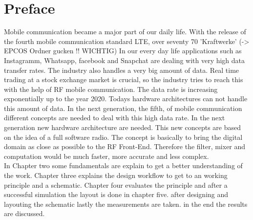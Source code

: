 \chapter{Preface}
Mobile communication became a major part of our daily life. With the release of the fourth mobile communication standard LTE, over seventy 70 'Kraftwerke' (-> EPCOS Ordner gucken !! WICHTIG)
In our every day life applications such as Instagramm, Whatsapp, facebook and Snapchat  are dealing with very high data transfer rates. The industry also handles a very big amount of data. Real time trading at a stock exchange market is crucial, so the industry tries to reach this with the help of RF mobile communication. The data rate is increasing exponentially up to the year 2020. Todays hardware architectures can not handle this amount of data. In the next generation, the fifth, of mobile communication different concepts are needed to deal with this high data rate. In the next generation new hardware architecture are needed. This new concepts are based on the idea of a full software radio. The concept is basically to bring the digital domain as close as possible to the RF Front-End. Therefore the filter, mixer and computation would be much faster, more accurate and less complex. \\
In Chapter two some fundamentals are explain to get a better understanding of the work. Chapter three explains the design workflow to get to an working principle and a schematic. Chapter four evaluates the principle and after a successful simulation the layout is done in chapter five. after designing and layouting the schematic lastly the measurements are taken. in the end the results are discussed.